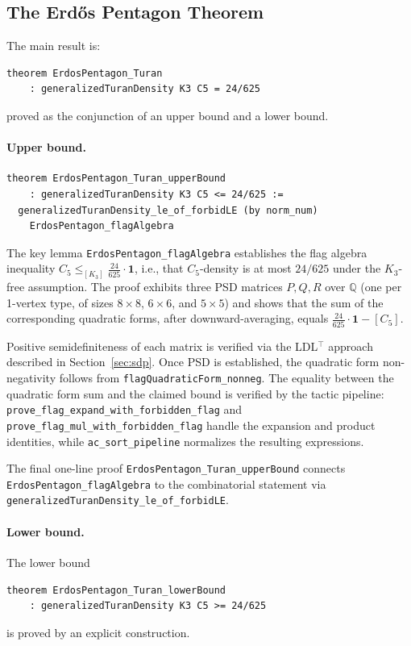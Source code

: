 \documentclass{article}
\newcommand{\lean}[1]{\texttt{#1}}
\begin{document}
\subsection{The Erd\H{o}s Pentagon Theorem}

The main result is:
\begin{lstlisting}
theorem ErdosPentagon_Turan
    : generalizedTuranDensity K3 C5 = 24/625
\end{lstlisting}
proved as the conjunction of an upper bound and a lower bound.

\paragraph{Upper bound.}
\begin{lstlisting}
theorem ErdosPentagon_Turan_upperBound
    : generalizedTuranDensity K3 C5 <= 24/625 :=
  generalizedTuranDensity_le_of_forbidLE (by norm_num)
    ErdosPentagon_flagAlgebra
\end{lstlisting}
The key lemma \lean{ErdosPentagon\_flagAlgebra} establishes the flag algebra
inequality $C_5 \leq_{[K_3]} \frac{24}{625} \cdot \mathbf{1}$, i.e., that
$C_5$-density is at most $24/625$ under the $K_3$-free assumption.
The proof exhibits three PSD matrices $P, Q, R$ over $\mathbb{Q}$
(one per 1-vertex type, of sizes $8\times 8$, $6\times 6$, and $5\times 5$)
and shows that the sum of the
corresponding quadratic forms, after downward-averaging, equals
$\frac{24}{625} \cdot \mathbf{1} - [C_5]$.

Positive semidefiniteness of each matrix is verified via the LDL$^\top$
approach described in Section~\ref{sec:sdp}.  Once PSD is established, the
quadratic form non-negativity follows from
\lean{flagQuadraticForm\_nonneg}.  The equality between the quadratic form
sum and the claimed bound is verified by the tactic pipeline:
\lean{prove\_flag\_expand\_with\_forbidden\_flag} and
\lean{prove\_flag\_mul\_with\_forbidden\_flag} handle the expansion and
product identities, while \lean{ac\_sort\_pipeline} normalizes the resulting
expressions.

The final one-line proof \lean{ErdosPentagon\_Turan\_upperBound} connects
\lean{ErdosPentagon\_flagAlgebra} to the combinatorial statement via
\lean{generalizedTuranDensity\_le\_of\_forbidLE}.

\paragraph{Lower bound.}
The lower bound
\begin{lstlisting}
theorem ErdosPentagon_Turan_lowerBound
    : generalizedTuranDensity K3 C5 >= 24/625
\end{lstlisting}
is proved by an explicit construction.
\end{document}
